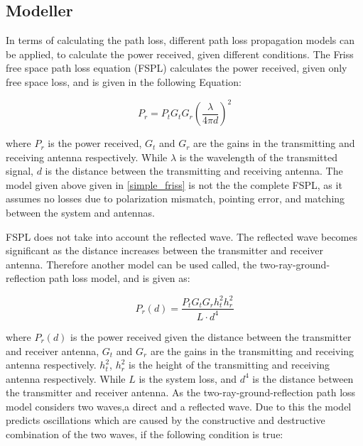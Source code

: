 \subsection{Modeller}

In terms of calculating the path loss, different path loss propagation models can be applied, to calculate the power received, given different conditions. The Friss free space path loss equation (FSPL) calculates the power received, given only free space loss, and is given in the following Equation:

\begin{equation}
P_r = P_t G_t G_r \left(\frac{\lambda}{4 \pi d}\right)^2
\label{simple_friss}
\end{equation}

where $P_{r}$ is the power received, $G_t$ and $G_r$ are the gains in the transmitting and receiving antenna respectively. While $\lambda$ is the wavelength of the transmitted signal, $d$ is the distance between the transmitting and receiving antenna. The model given above given in \eqref{simple_friss} is not the the complete FSPL, as it assumes no losses due to polarization mismatch, pointing error, and matching between the system and antennas. 

FSPL does not take into account the reflected wave. The reflected wave becomes significant as the distance increases between the transmitter and receiver antenna. Therefore another model can be used called, the two-ray-ground-reflection path loss model, and is given as:

\begin{equation}
P_r(d) = \frac{P_t G_t G_r h^2_t h^2_r}{L \cdot d^4}
\label{two_ray_model}
\end{equation}

where $P_r(d)$ is the power received given the distance between the transmitter and receiver antenna, $G_t$ and $G_r$ are the gains in the transmitting and receiving antenna respectively. $h^2_t$, $h^2_r$ is the height of the transmitting and receiving antenna respectively.  While $L$ is the system loss, and $d^{4}$ is the distance between the transmitter and receiver antenna. As the two-ray-ground-reflection path loss model considers two waves,a direct and a reflected wave. Due to this the model predicts  oscillations which are caused by the constructive and destructive combination of the two waves, if the following condition is true:





